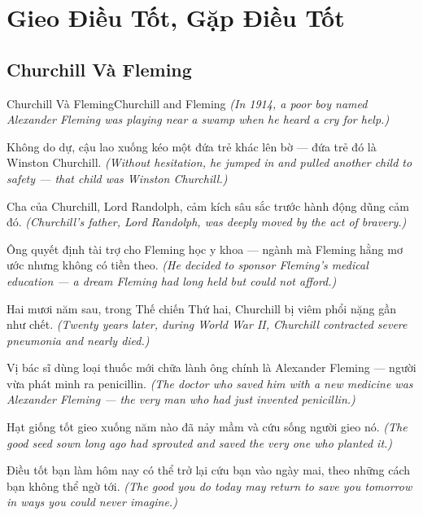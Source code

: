 \chapter{Gieo Điều Tốt, Gặp Điều Tốt}

\section{Churchill Và Fleming}
\begin{truyen}{Churchill Và Fleming}{Churchill and Fleming}
\textit{(In 1914, a poor boy named Alexander Fleming was playing near a swamp when he heard a cry for help.)}

Không do dự, cậu lao xuống kéo một đứa trẻ khác lên bờ — đứa trẻ đó là Winston Churchill.
\textit{(Without hesitation, he jumped in and pulled another child to safety — that child was Winston Churchill.)}

Cha của Churchill, Lord Randolph, cảm kích sâu sắc trước hành động dũng cảm đó.
\textit{(Churchill's father, Lord Randolph, was deeply moved by the act of bravery.)}

Ông quyết định tài trợ cho Fleming học y khoa — ngành mà Fleming hằng mơ ước nhưng không có tiền theo.
\textit{(He decided to sponsor Fleming's medical education — a dream Fleming had long held but could not afford.)}

Hai mươi năm sau, trong Thế chiến Thứ hai, Churchill bị viêm phổi nặng gần như chết.
\textit{(Twenty years later, during World War II, Churchill contracted severe pneumonia and nearly died.)}

Vị bác sĩ dùng loại thuốc mới chữa lành ông chính là Alexander Fleming — người vừa phát minh ra penicillin.
\textit{(The doctor who saved him with a new medicine was Alexander Fleming — the very man who had just invented penicillin.)}

Hạt giống tốt gieo xuống năm nào đã nảy mầm và cứu sống người gieo nó.
\textit{(The good seed sown long ago had sprouted and saved the very one who planted it.)}

\end{truyen}

\begin{baihoc}
Điều tốt bạn làm hôm nay có thể trở lại cứu bạn vào ngày mai, theo những cách bạn không thể ngờ tới.
\textit{(The good you do today may return to save you tomorrow in ways you could never imagine.)}
\end{baihoc}
\ngancach

